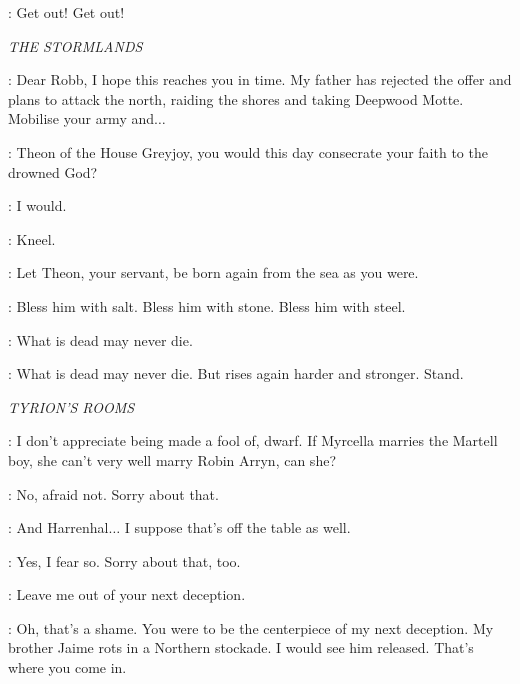 \CERSEI: Get out! Get out! 


\scene

\textit{THE STORMLANDS} 


\THEON: Dear Robb, I hope this reaches you in time. My father has rejected the offer and plans to attack the north, raiding the shores and taking Deepwood Motte. Mobilise your army and$\ldots$ 



\DROWNEDPRIEST: Theon of the House Greyjoy, you would this day consecrate your faith to the drowned God? 

\THEON: I would. 

\DROWNEDPRIEST: Kneel. 


\DROWNEDPRIEST: Let Theon, your servant, be born again from the sea as you were. 


\DROWNEDPRIEST: Bless him with salt. Bless him with stone. Bless him with steel. 

\THEON: What is dead may never die. 

\DROWNEDPRIEST: What is dead may never die. But rises again harder and stronger. Stand. 


\scene

\textit{TYRION'S ROOMS} 

\LITTLEFINGER: I don't appreciate being made a fool of, dwarf. If Myrcella marries the Martell boy, she can't very well marry Robin Arryn, can she? 

\TYRION: No, afraid not. Sorry about that. 

\LITTLEFINGER: And Harrenhal$\ldots$ I suppose that's off the table as well. 

\TYRION: Yes, I fear so. Sorry about that, too. 

\LITTLEFINGER: Leave me out of your next deception. 

\TYRION: Oh, that's a shame. You were to be the centerpiece of my next deception. My brother Jaime rots in a Northern stockade. I would see him released. That's where you come in. 

